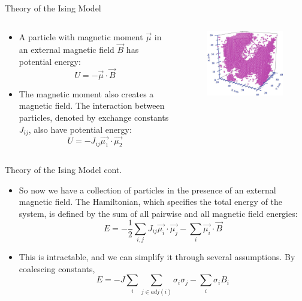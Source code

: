 \documentclass{minesbeamer}
\begin{document}
\begin{frame}{Theory of the Ising Model}
    \begin{columns}
        \begin{column}{0.6\textwidth}
            \begin{itemize}
                \item A particle with magnetic moment $\vec{\mu}$ in an external magnetic field $\vec{B}$ has potential energy: $$U = -\vec{\mu}\cdot \vec{B}$$
                \item The magnetic moment also creates a magnetic field. The interaction between particles, denoted by exchange constants $J_{ij}$, also have potential energy: $$U = -J_{ij}\vec{\mu_1}\cdot\vec{\mu_2}$$
            \end{itemize}
        \end{column}
        \begin{column}{0.4\textwidth}
            \begin{figure}
                \centering
                \includegraphics[height=0.6\textheight]{F5.png}
            \end{figure}
        \end{column}
    \end{columns}
\end{frame}

\begin{frame}{Theory of the Ising Model cont.}
    \centering
    \begin{itemize}
        \item So now we have a collection of particles in the presence of an external magnetic field. The Hamiltonian, which specifies the total energy of the system, is defined by the sum of all pairwise and all magnetic field energies:$$E = -\frac{1}{2}\sum_{i,j}J_{ij}\vec{\mu_i}\cdot\vec{\mu_j}-\sum_i \vec{\mu_i}\cdot\vec{B}$$
        \item This is intractable, and we can simplify it through several assumptions. By coalescing constants,$$E=-J\sum_i\sum_{j\in adj(i)}\sigma_i\sigma_j -\sum_i \sigma_i B_i$$
    \end{itemize}
\end{frame}
\end{document}

